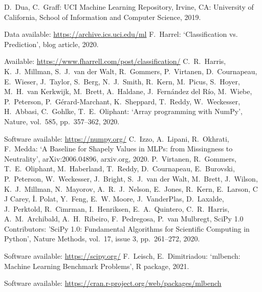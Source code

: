 \begin{thebibliography}{99}
%
D.\ Dua, C.\ Graff: UCI Machine Learning Repository, Irvine, CA: University of California, School of Information and Computer Science, 2019.\par
%
Data available: \url{https://archive.ics.uci.edu/ml}
%
F.\ Harrel: `Classification vs. Prediction', blog article, 2020.\par
%
Available: \url{https://www.fharrell.com/post/classification/}
%
C.\ R.\ Harris, K.\ J.\ Millman, S.\ J.\ van der Walt, R.\ Gommers, P.\ Virtanen, D.\ Cournapeau, E.\ Wieser, J.\ Taylor, S.\ Berg, N.\ J.\ Smith, R.\ Kern, M.\ Picus, S.\ Hoyer, M.\ H.\ van Kerkwijk, M.\ Brett, A.\ Haldane, J.\ Fern{\'a}ndez del R{\'i}o, M.\ Wiebe, P.\ Peterson, P.\ G{\'e}rard-Marchant, K.\ Sheppard, T.\ Reddy, W.\ Weckesser, H.\ Abbasi, C.\ Gohlke, T.\ E.\ Oliphant: `Array programming with NumPy', Nature, vol.\ 585, pp.\ 357--362, 2020.\par
%
Software available: \url{https://numpy.org/}
%
C.\ Izzo, A.\ Lipani, R.\ Okhrati, F.\ Medda: `A Baseline for Shapely Values in MLPs: from Missingness to Neutrality', arXiv:2006.04896, arxiv.org, 2020.
%
P.\ Virtanen, R.\ Gommers, T.\ E.\ Oliphant, M.\ Haberland, T.\ Reddy, D.\ Cournapeau, E.\ Burovski, P.\ Peterson, W.\ Weckesser, J.\ Bright, S.\ J.\ van der Walt, M.\ Brett, J.\ Wilson, K.\ J.\ Millman, N.\ Mayorov, A.\ R.\ J.\ Nelson, E.\ Jones, R.\ Kern, E.\ Larson, C J Carey, {\.I}. Polat, Y.\ Feng, E.\ W. Moore, J.\ VanderPlas, D.\ Laxalde, J.\ Perktold, R.\ Cimrman, I.\ Henriksen, E.\ A.\ Quintero, C.\ R.\ Harris, A.\ M.\ Archibald, A.\ H.\ Ribeiro, F.\ Pedregosa, P.\ van Mulbregt, SciPy 1.0 Contributors: 'SciPy 1.0: Fundamental Algorithms for Scientific Computing in Python', Nature Methods, vol.\ 17, issue 3, pp.\ 261--272, 2020.\par
%
Software available: \url{https://scipy.org/}
%
F.\ Leisch, E.\ Dimitriadou: `mlbench: Machine Learning Benchmark Problems', R package, 2021.\par
%
Software available: \url{https://cran.r-project.org/web/packages/mlbench}
\end{thebibliography}
\endinput
